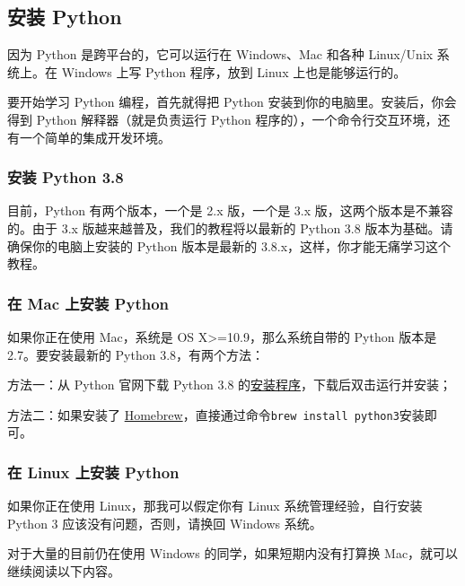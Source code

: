 \hypertarget{ux5b89ux88c5-python}{%
\subsection{安装 Python}\label{ux5b89ux88c5-python}}

因为 Python 是跨平台的，它可以运行在 Windows、Mac 和各种 Linux/Unix
系统上。在 Windows 上写 Python 程序，放到 Linux 上也是能够运行的。

要开始学习 Python 编程，首先就得把 Python
安装到你的电脑里。安装后，你会得到 Python 解释器（就是负责运行 Python
程序的），一个命令行交互环境，还有一个简单的集成开发环境。

\hypertarget{ux5b89ux88c5-python-3.8}{%
\subsubsection{安装 Python 3.8}\label{ux5b89ux88c5-python-3.8}}

目前，Python 有两个版本，一个是 2.x 版，一个是 3.x
版，这两个版本是不兼容的。由于 3.x 版越来越普及，我们的教程将以最新的
Python 3.8 版本为基础。请确保你的电脑上安装的 Python 版本是最新的
3.8.x，这样，你才能无痛学习这个教程。

\hypertarget{ux5728-mac-ux4e0aux5b89ux88c5-python}{%
\subsubsection{在 Mac 上安装
Python}\label{ux5728-mac-ux4e0aux5b89ux88c5-python}}

如果你正在使用 Mac，系统是 OS X\textgreater=10.9，那么系统自带的 Python
版本是 2.7。要安装最新的 Python 3.8，有两个方法：

方法一：从 Python 官网下载 Python 3.8
的\href{https://www.python.org/downloads/}{安装程序}，下载后双击运行并安装；

方法二：如果安装了
\href{https://brew.sh/}{Homebrew}，直接通过命令\texttt{brew\ install\ python3}安装即可。

\hypertarget{ux5728-linux-ux4e0aux5b89ux88c5-python}{%
\subsubsection{在 Linux 上安装
Python}\label{ux5728-linux-ux4e0aux5b89ux88c5-python}}

如果你正在使用 Linux，那我可以假定你有 Linux 系统管理经验，自行安装
Python 3 应该没有问题，否则，请换回 Windows 系统。

对于大量的目前仍在使用 Windows 的同学，如果短期内没有打算换
Mac，就可以继续阅读以下内容。

